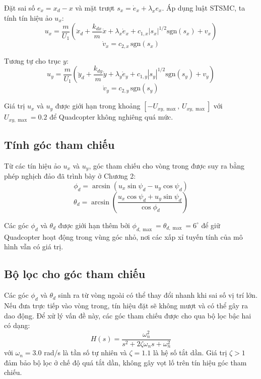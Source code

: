 \documentclass[12pt,a4paper]{report}
\begin{document}
Đặt sai số $e_x = x_d - x$ và mặt trượt $s_x = \dot{e}_x + \lambda_x e_x$. Áp dụng luật STSMC, ta tính tín hiệu ảo $u_x$:
\begin{equation}
u_x = \frac{m}{U_1} \left( \ddot{x}_d + \frac{k_{dx}}{m} \dot{x} + \lambda_x \dot{e}_x + c_{1,x} |s_x|^{1/2} \text{sgn}(s_x) + v_x \right)
\end{equation}
\begin{equation}
\dot{v}_x = c_{2,x} \, \text{sgn}(s_x)
\end{equation}

Tương tự cho trục $y$:
\begin{equation}
u_y = \frac{m}{U_1} \left( \ddot{y}_d + \frac{k_{dy}}{m} \dot{y} + \lambda_y \dot{e}_y + c_{1,y} |s_y|^{1/2} \text{sgn}(s_y) + v_y \right)
\end{equation}
\begin{equation}
\dot{v}_y = c_{2,y} \, \text{sgn}(s_y)
\end{equation}

Giá trị $u_x$ và $u_y$ được giới hạn trong khoảng $[-U_{xy,\max}, \, U_{xy,\max}]$ với $U_{xy,\max} = 0.2$ để Quadcopter không nghiêng quá mức.

\subsection{Tính góc tham chiếu}
Từ các tín hiệu ảo $u_x$ và $u_y$, góc tham chiếu cho vòng trong được suy ra bằng phép nghịch đảo đã trình bày ở Chương 2:
\begin{equation}
\phi_d = \arcsin(u_x \sin\psi_d - u_y \cos\psi_d)
\end{equation}
\begin{equation}
\theta_d = \arcsin\left(\frac{u_x \cos\psi_d + u_y \sin\psi_d}{\cos\phi_d}\right)
\end{equation}

Các góc $\phi_d$ và $\theta_d$ được giới hạn thêm bởi $\phi_{d,\max} = \theta_{d,\max} = 6^\circ$ để giữ Quadcopter hoạt động trong vùng góc nhỏ, nơi các xấp xỉ tuyến tính của mô hình vẫn có giá trị.

\subsection{Bộ lọc cho góc tham chiếu}
Các góc $\phi_d$ và $\theta_d$ sinh ra từ vòng ngoài có thể thay đổi nhanh khi sai số vị trí lớn. Nếu đưa trực tiếp vào vòng trong, tín hiệu đặt sẽ không mượt và có thể gây ra dao động. Để xử lý vấn đề này, các góc tham chiếu được cho qua bộ lọc bậc hai có dạng:
\begin{equation}
H(s) = \frac{\omega_n^2}{s^2 + 2\zeta\omega_n s + \omega_n^2}
\end{equation}
với $\omega_n = 3.0$ rad/s là tần số tự nhiên và $\zeta = 1.1$ là hệ số tắt dần. Giá trị $\zeta > 1$ đảm bảo bộ lọc ở chế độ quá tắt dần, không gây vọt lố trên tín hiệu góc tham chiếu.
\end{document}
